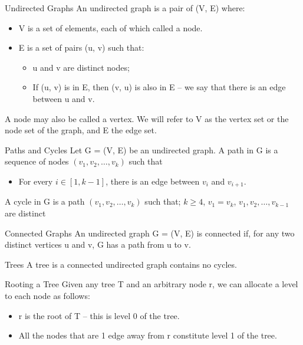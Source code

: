 \documentclass{lecture}
\begin{document}
\begin{landscape}
\begin{multicols}{2}
    \begin{note}{Undirected Graphs}
        An undirected graph is a pair of (V, E) where:
        \begin{itemize}[nolistsep]
            \item V is a set of elements, each of which called a node.
            \item E is a set of pairs (u, v) such that:
                \begin{itemize}[nolistsep]
                    \item u and v are distinct nodes;
                    \item If (u, v) is in E, then (v, u) is also in E -- we say that there is an edge between u and v.
                \end{itemize}
        \end{itemize}
        A node may also be called a vertex. We will refer to V as the vertex set or the node set of the graph, and E the edge set.
    \end{note}
    \vfill
    \begin{note}{Paths and Cycles}
        Let G = (V, E) be an undirected graph. A path in G is a sequence of nodes $(v_1, v_2, \ldots, v_k)$ such that
        \begin{itemize}[nolistsep]
            \item For every $i\in [1, k-1]$, there is an edge between $v_i$ and $v_{i+1}$.
        \end{itemize}
        A cycle in G is a path $(v_1, v_2, \ldots, v_k)$ such that; $k\geq 4$, $v_1 = v_k$, $v_1, v_2, \ldots, v_{k-1}$ are distinct
    \end{note}
    \vfill
    \begin{note}{Connected Graphs}
        An undirected graph G = (V, E) is connected if, for any two distinct vertices u and v, G has a path from u to v.
    \end{note}
    \vfill
    \begin{note}{Trees}
        A tree is a connected undirected graph contains no cycles.
    \end{note}
    \vfill
    \begin{note}{Rooting a Tree}
        Given any tree T and an arbitrary node r, we can allocate a level to each node as follows:
        \begin{itemize}[nolistsep]
            \item r is the root of T -- this is level 0 of the tree.
            \item All the nodes that are 1 edge away from r constitute level 1 of the tree.

\end{itemize}
\end{note}
\end{multicols}
\end{landscape}
\end{document}
